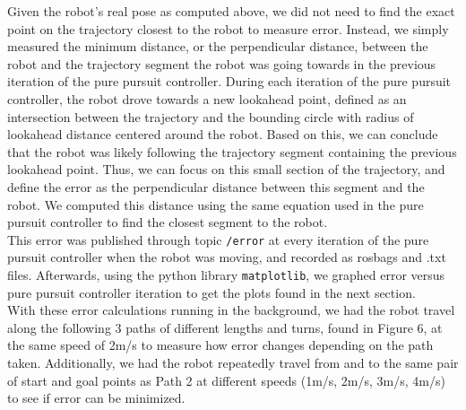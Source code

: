 \documentclass{article}
\begin{document}
Given the robot's real pose as computed above, we did not need to find the exact point on the trajectory closest to the robot to measure error. Instead, we simply measured the minimum distance, or the perpendicular distance, between the robot and the trajectory segment the robot was going towards in the previous iteration of the pure pursuit controller. During each iteration of the pure pursuit controller, the robot drove towards a new lookahead point, defined as an intersection between the trajectory and the bounding circle with radius of lookahead distance centered around the robot. Based on this, we can conclude that the robot was likely following the trajectory segment containing the previous lookahead point. Thus, we can focus on this small section of the trajectory, and define the error as the perpendicular distance between this segment and the robot. We computed this distance using the same equation used in the pure pursuit controller to find the closest segment to the robot. \\

This error was published through topic \texttt{/error} at every iteration of the pure pursuit controller when the robot was moving, and recorded as rosbags and .txt files. Afterwards, using the python library \texttt{matplotlib}, we graphed error versus pure pursuit controller iteration to get the plots found in the next section. \\

With these error calculations running in the background, we had the robot travel along the following 3 paths of different lengths and turns, found in Figure 6, at the same speed of 2m/s to measure how error changes depending on the path taken. Additionally, we had the robot repeatedly travel from and to the same pair of start and goal points as Path 2 at different speeds (1m/s, 2m/s, 3m/s, 4m/s) to see if error can be minimized. 
\end{document}
